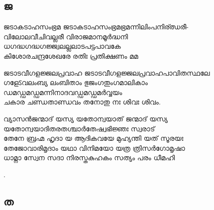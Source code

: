 \subsection{ജ}


\begin{enumerate}


\begin{slokam}{\VPc}{\Rav}{ജടാകടാഹസംഭ്രമ}
ജടാകടാഹസംഭ്രമഭ്രമന്നിലിംപനിര്ഝരീ- \\
വിലോലവീചിവല്ലരീ വിരാജമാനമൂർദ്ധനി\\
ധഗദ്ധഗദ്ധഗജ്ജ്വലല്ലലാടപട്ടപാവകേ \\
കിശോരചന്ദ്രശേഖരേ രതിഃ പ്രതിക്ഷണം മമ
\end{slokam}



\begin{slokam}{\VPc}{\Rav}{ജടാടവീഗളജ്ജലപ്രവാഹ}
ജടാടവീഗളജ്ജലപ്രവാഹപാവിതസ്ഥലേ\\
ഗളേऽവലംബ്യ ലംബിതാം ഭുജംഗതുംഗമാലികാം\\
ഡമഡ്ഡമഡ്ഡമന്നിനാദവഡ്ഡമഡ്ഡമർവ്വയം\\
ചകാര ചണ്ഡതാണ്ഡവം തനോതു നഃ ശിവഃ ശിവം.
\end{slokam}


\begin{slokam}{\VSv}{വ്യാസൻ}{ജന്മാദ് യസ്യ യതോന്വയാത്}
ജന്മാദ് യസ്യ യതോന്വയാദിതരതശ്ചാർതേഷ്വഭിജ്ഞഃ സ്വരാട്\\
തേനേ ബ്രഹ്മ ഹൃദാ യ ആദികവയേ മുഹ്യന്തി യത് സൂരയഃ\\
തേജോവാരിമൃദാം യഥാ വിനിമയോ യത്ര ത്രിസർഗോമൃഷാ\\
ധാമ്നാ സ്വേന സദാ നിരസ്തകുഹകം സത്യം പരം ധീമഹി
\end{slokam}


.

\end{enumerate}



\subsection{ത}

